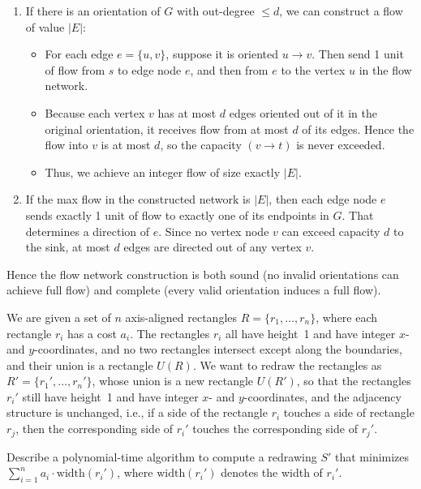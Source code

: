\documentclass[11pt]{article}
\begin{document}
\begin{description}
\begin{enumerate}
\item[1.] If there is an orientation of \(G\) with out-degree \(\le d\), we can construct a flow of value \(\lvert E\rvert\):
  \begin{itemize}
    \item For each edge \(e = \{u,v\}\), suppose it is oriented \(u \to v\).  Then send 1 unit of flow from \(s\) to edge node \(e\), and then from \(e\) to the vertex \(u\) in the flow network.  
    \item Because each vertex \(v\) has at most \(d\) edges oriented out of it in the original orientation, it receives flow from at most \(d\) of its edges.  Hence the flow into \(v\) is at most \(d\), so the capacity \((v \to t)\) is never exceeded.  
    \item Thus, we achieve an integer flow of size exactly \(\lvert E\rvert\).  
  \end{itemize}
\item[2.] If the max flow in the constructed network is \(\lvert E\rvert\), then each edge node \(e\) sends exactly 1 unit of flow to exactly one of its endpoints in \(G\).  That determines a direction of \(e\).  Since no vertex node \(v\) can exceed capacity \(d\) to the sink, at most \(d\) edges are directed out of any vertex \(v\).  
\end{enumerate}

Hence the flow network construction is both sound (no invalid orientations can achieve full flow) and complete (every valid orientation induces a full flow).



\newpage
\item[Problem 7.3:]
We are given a set of $n$ axis-aligned rectangles $R=\{r_1,\ldots,r_n\}$, where each rectangle $r_i$ has a cost $a_i$.  The rectangles $r_i$ all have height~1 and have integer $x$- and $y$-coordinates, and no two rectangles intersect except along the boundaries, and their union is a rectangle $U(R)$.
We want to redraw the rectangles as $R'=\{r_1',\ldots,r_n'\}$, whose union
is a new rectangle $U(R')$, so that  the rectangles $r_i'$ still have
height~1 and have integer $x$- and $y$-coordinates, and 
the adjacency structure is unchanged, i.e., if a side of the
rectangle $r_i$ touches a side of rectangle $r_j$,
then the corresponding side of $r_i'$ touches the corresponding side of $r_j'$.

Describe a polynomial-time algorithm to compute a redrawing $S'$ that minimizes $\sum_{i=1}^n a_i\cdot\textrm{width}(r_i')$, where $\textrm{width}(r_i')$ denotes
the width of $r_i'$.


\end{description}
\end{document}
